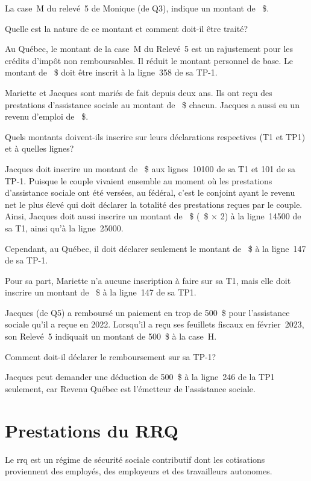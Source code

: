 \begin{question}
	La case~M du relevé~5 de Monique (de Q3), indique un montant de ~\$.
	
	Quelle est la nature de ce montant et comment doit-il être traité?
\end{question}
Au Québec, le montant de la case~M du Relevé~5 est un rajustement pour les crédits d'impôt non remboursables. Il réduit le montant personnel de base. Le montant de ~\$ doit être inscrit à la ligne~358 de sa TP-1.

\begin{question}
	Mariette et Jacques sont mariés de fait depuis deux ans. Ils ont reçu des prestations d'assistance sociale au montant de ~\$ chacun. Jacques a aussi eu un revenu d'emploi de ~\$.
	
	Quels montants doivent-ils inscrire sur leurs déclarations respectives (T1 et TP1) et à quelles lignes?
\end{question}
Jacques doit inscrire un montant de ~\$ aux lignes~10100 de sa T1 et 101 de sa TP-1. Puisque le couple vivaient ensemble au moment où les prestations d'assistance sociale ont été versées, au fédéral, c'est le conjoint ayant le revenu net le plus élevé qui doit déclarer la totalité des prestations reçues par le couple. Ainsi, Jacques doit aussi inscrire un montant de ~\$ (~\$ $\times$ 2) à la ligne~14500 de sa T1, ainsi qu'à la ligne~25000.

Cependant, au Québec, il doit déclarer seulement le montant de ~\$ à la ligne~147 de sa TP-1.

Pour sa part, Mariette n'a aucune inscription à faire sur sa T1, mais elle doit inscrire un montant de ~\$ à la ligne~147 de sa TP1.

\begin{question}
	Jacques (de Q5) a remboursé un paiement en trop de 500~\$ pour l'assistance sociale qu'il a reçue en 2022. Lorsqu'il a reçu ses feuillets fiscaux en février~2023, son Relevé~5 indiquait un montant de 500~\$ à la case~H.
	
	Comment doit-il déclarer le remboursement sur sa TP-1?
\end{question}
Jacques peut demander une déduction de 500~\$ à la ligne~246 de la TP1 seulement, car Revenu Québec est l'émetteur de l'assistance sociale.



\section{Prestations du RRQ}
\begin{intro}
	Le \acrfull{rrq} est un régime de sécurité sociale contributif dont les cotisations proviennent des employés, des employeurs et des travailleurs autonomes.
\end{intro}
